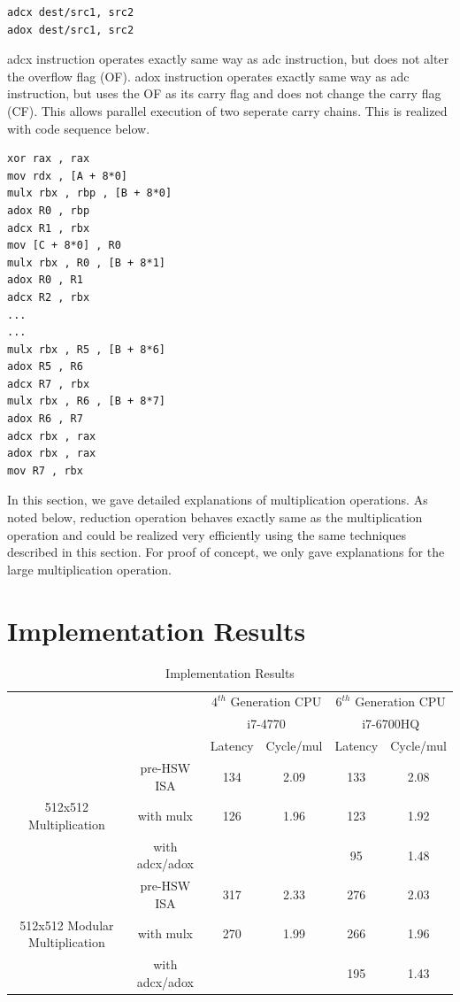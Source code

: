 \documentclass[twocolumn]{svjour3}          %
\begin{document}
\begin{verbatim}
adcx dest/src1, src2
adox dest/src1, src2
\end{verbatim}
adcx instruction operates exactly same way as adc instruction, but does not alter the overflow flag (OF). adox instruction operates exactly same way as adc instruction, but uses the OF as its carry flag and does not change the carry flag (CF). This allows parallel execution of two seperate carry chains. This is realized with code sequence below. 

\begin{verbatim}
xor rax , rax
mov rdx , [A + 8*0]
mulx rbx , rbp , [B + 8*0]
adox R0 , rbp
adcx R1 , rbx
mov [C + 8*0] , R0
mulx rbx , R0 , [B + 8*1]
adox R0 , R1
adcx R2 , rbx
...
...
mulx rbx , R5 , [B + 8*6]
adox R5 , R6
adcx R7 , rbx
mulx rbx , R6 , [B + 8*7]
adox R6 , R7
adcx rbx , rax
adox rbx , rax
mov R7 , rbx
\end{verbatim}

In this section, we gave detailed explanations of multiplication operations. As noted below, reduction operation behaves exactly same as the multiplication operation and could be realized very efficiently using the same techniques described in this section. For proof of concept, we only gave explanations for the large multiplication operation. 

\section{Implementation Results}
\label{sec:res}

\begin{table}[ht]
\caption{Implementation Results}
\label{table:impres}
\begin{center}
\begin{tabular}{|c|c|c|c|c|c|}
\hline
\multicolumn{2}{|c|}{}	& \multicolumn{2}{c|}{$4^{th}$ Generation CPU} & \multicolumn{2}{c|}{$6^{th}$ Generation CPU} \\
\multicolumn{2}{|c|}{}	& \multicolumn{2}{c|}{i7-4770} & \multicolumn{2}{c|}{i7-6700HQ} \\
\cline{3-6}
\multicolumn{2}{|c|}{}	& Latency & Cycle/mul & Latency & Cycle/mul \\
\hline
 & pre-HSW ISA & 134 & 2.09 & 133 & 2.08 \\
\cline{2-6}
512x512 Multiplication & with mulx & 126 & 1.96 & 123 & 1.92 \\
\cline{2-6}
 & with adcx/adox &  &  & 95 & 1.48 \\
\hline
 & pre-HSW ISA & 317 & 2.33 & 276 & 2.03 \\
\cline{2-6}
512x512 Modular Multiplication & with mulx & 270 & 1.99 & 266 & 1.96 \\
\cline{2-6}
 & with adcx/adox &  &  & 195 & 1.43 \\
\hline
\end{tabular}
\end{center}
\end{table}
\end{document}
